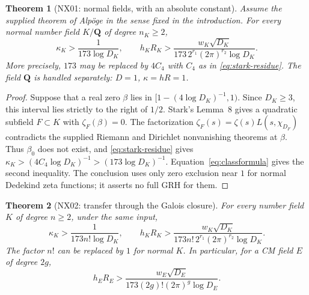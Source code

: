 \documentclass[11pt]{article}
\newtheorem{theorem}{Theorem}[section]
\theoremstyle{remark}
\begin{document}
\begin{theorem}[NX01: normal fields, with an absolute constant]
\label{NX01}
Assume the supplied theorem of Alp\"oge in the sense fixed in the
introduction. For every normal number field $K/\mathbf Q$ of degree
$n_K\geq2$,
\begin{equation}\label{eq:normal-lower}
 \boxed{\quad
 \kappa_K>\frac1{173\log D_K},\qquad
 h_KR_K>
 \frac{w_K\sqrt{D_K}}
 {173\,2^{r_1}(2\pi)^{r_2}\log D_K}.
 \quad}
\end{equation}
More precisely, $173$ may be replaced by $4C_4$ with $C_4$ as in
\eqref{eq:stark-residue}. The field $\mathbf Q$ is handled separately:
$D=1$, $\kappa=hR=1$.
\end{theorem}

\begin{proof}
Suppose that a real zero $\beta$ lies in
$[1-(4\log D_K)^{-1},1)$. Since $D_K\geq3$, this interval lies strictly
to the right of $1/2$. Stark's Lemma~8 gives a quadratic subfield
$F\subset K$ with $\zeta_F(\beta)=0$. The factorization
$\zeta_F(s)=\zeta(s)L(s,\chi_{D_F})$ contradicts the supplied
Riemann and Dirichlet nonvanishing theorems at $\beta$.
Thus $\beta_0$ does not exist, and \eqref{eq:stark-residue} gives
$\kappa_K>(4C_4\log D_K)^{-1}>(173\log D_K)^{-1}$.
Equation~\eqref{eq:classformula} gives the second inequality.
The conclusion uses only zero exclusion near $1$ for normal Dedekind
zeta functions; it asserts no full GRH for them.
\end{proof}

\begin{theorem}[NX02: transfer through the Galois closure]
\label{NX02}
For every number field $K$ of degree $n\geq2$, under the same input,
\begin{equation}\label{eq:all-fields-lower}
 \boxed{\quad
 \kappa_K>\frac1{173n!\log D_K},\qquad
 h_KR_K>
 \frac{w_K\sqrt{D_K}}
 {173n!\,2^{r_1}(2\pi)^{r_2}\log D_K}.
 \quad}
\end{equation}
The factor $n!$ can be replaced by $1$ for normal $K$. In particular,
for a CM field $E$ of degree $2g$,
\begin{equation}\label{eq:cm-hR}
 h_ER_E>\frac{w_E\sqrt{D_E}}
 {173(2g)!(2\pi)^g\log D_E}.
\end{equation}
\end{theorem}
\end{document}

